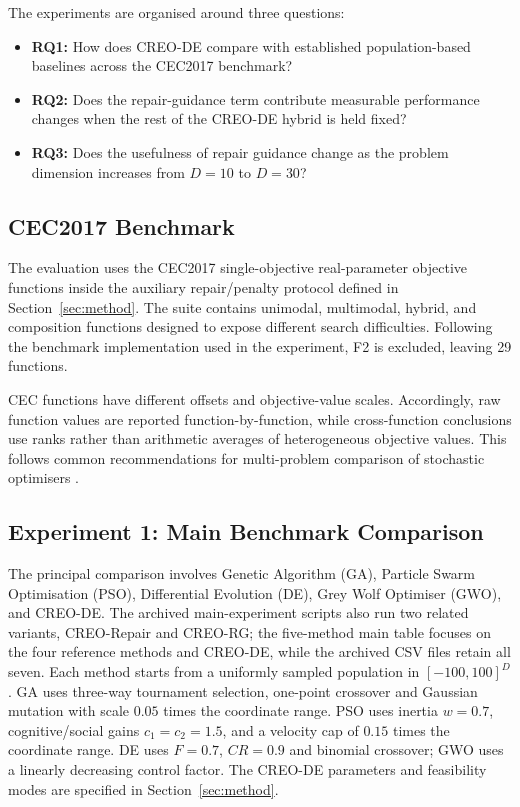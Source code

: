 \documentclass[a4paper,fleqn]{cas-sc}
\begin{document}
The experiments are organised around three questions:
\begin{itemize}
    \item \textbf{RQ1:} How does CREO-DE compare with established population-based baselines across the CEC2017 benchmark?
    \item \textbf{RQ2:} Does the repair-guidance term contribute measurable performance changes when the rest of the CREO-DE hybrid is held fixed?
    \item \textbf{RQ3:} Does the usefulness of repair guidance change as the problem dimension increases from $D=10$ to $D=30$?
\end{itemize}

\subsection{CEC2017 Benchmark}

The evaluation uses the CEC2017 single-objective real-parameter objective functions \cite{awad2017cec} inside the auxiliary repair/penalty protocol defined in Section~\ref{sec:method}. The suite contains unimodal, multimodal, hybrid, and composition functions designed to expose different search difficulties. Following the benchmark implementation used in the experiment, F2 is excluded, leaving 29 functions.

CEC functions have different offsets and objective-value scales. Accordingly, raw function values are reported function-by-function, while cross-function conclusions use ranks rather than arithmetic averages of heterogeneous objective values. This follows common recommendations for multi-problem comparison of stochastic optimisers \cite{garcia2009nonparametric,derrac2011tutorial}.

\subsection{Experiment 1: Main Benchmark Comparison}

The principal comparison involves Genetic Algorithm (GA), Particle Swarm Optimisation (PSO), Differential Evolution (DE), Grey Wolf Optimiser (GWO), and CREO-DE. The archived main-experiment scripts also run two related variants, CREO-Repair and CREO-RG; the five-method main table focuses on the four reference methods and CREO-DE, while the archived CSV files retain all seven. Each method starts from a uniformly sampled population in $[-100,100]^D$. GA uses three-way tournament selection, one-point crossover and Gaussian mutation with scale $0.05$ times the coordinate range. PSO uses inertia $w=0.7$, cognitive/social gains $c_1=c_2=1.5$, and a velocity cap of $0.15$ times the coordinate range. DE uses $F=0.7$, $CR=0.9$ and binomial crossover; GWO uses a linearly decreasing control factor. The CREO-DE parameters and feasibility modes are specified in Section~\ref{sec:method}.
\end{document}
